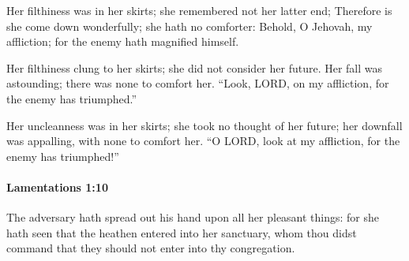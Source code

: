 			\begin{versebox}
					\item[BHS] 
					\item[LXX] 
					\item[ASV] Her filthiness was in her skirts; she remembered not her latter end; Therefore is she come down wonderfully; she hath no comforter: Behold, O Jehovah, my affliction; for the enemy hath magnified himself.
					\item[NIV] Her filthiness clung to her skirts; she did not consider her future. Her fall was astounding; there was none to comfort her. “Look, LORD, on my affliction, for the enemy has triumphed.”
					\item[NRSV] Her uncleanness was in her skirts; she took no thought of her future; her downfall was appalling, with none to comfort her. “O LORD, look at my affliction, for the enemy has triumphed!”
			\end{versebox}

		\paragraph{Lamentations 1:10} %
			\label{LAMENTATIONS-1-10}

			The adversary hath spread out his hand upon all her pleasant things: for she hath seen that the heathen entered into her sanctuary, whom thou didst command that they should not enter into thy congregation.

